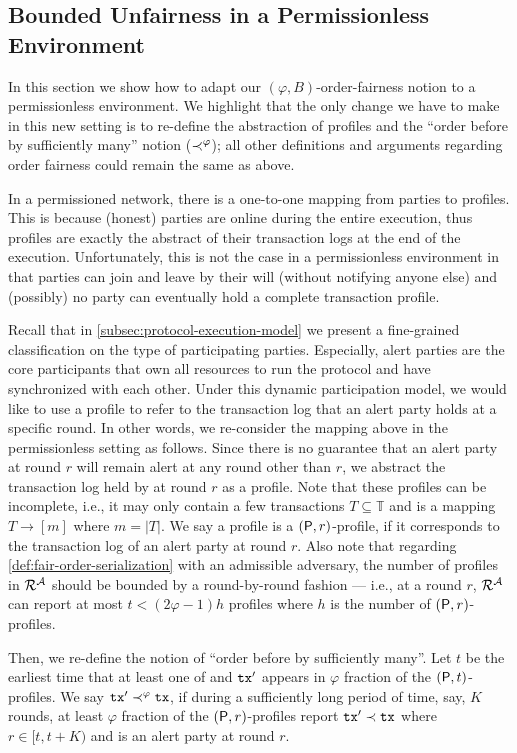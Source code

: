 \subsection{Bounded Unfairness in a  Permissionless Environment}
\label{subsec:order-fiarness-permissionless}

In this section we show how to adapt our $(\varphi, B)$-order-fairness notion to a permissionless environment.
%
We highlight that the only change we have to make in this new setting is to re-define the abstraction of profiles and the ``order before by sufficiently many'' notion ($\prec^\varphi$); all other definitions and arguments regarding order fairness could remain the same as above.

In a permissioned network, there is a one-to-one mapping from parties to profiles.
%
This is because (honest) parties are online during the entire execution, thus profiles are exactly the abstract of their transaction logs at the end of the execution.
%
Unfortunately, this is not the case in a permissionless environment in that parties can join and leave by their will (without notifying anyone else) and (possibly) no party can eventually hold a complete transaction profile.

Recall that in \cref{subsec:protocol-execution-model} we present a fine-grained classification on the type of participating parties.
%
Especially, alert parties are the core participants that own all resources to run the protocol and have synchronized with each other.
%
Under this dynamic participation model, we would like to use a profile to refer to the transaction log that an alert party holds at a specific round.
%
In other words, we re-consider the mapping above in the permissionless setting as follows.
%
Since there is no guarantee that an alert party \party at round $r$ will remain alert at any round other than $r$, we abstract the transaction log held by \party at round $r$ as a profile.
%
Note that these profiles can be incomplete, i.e., it may only contain a few transactions $T \subseteq \mathbb{T}$ and is a mapping $T \rightarrow [m]$ where $m = |T|$.
%
We say a profile is a $(\mathsf{P}, r)$-profile, if it corresponds to the transaction log of an alert party at round $r$.
%
Also note that regarding \cref{def:fair-order-serialization} with an admissible adversary, the number of profiles in $\mathcal{R}^\mathcal{A}$ should be bounded by a round-by-round fashion --- i.e., at a round $r$, $\mathcal{R}^\mathcal{A}$ can report at most $t < (2\varphi - 1) h$ profiles where $h$ is the number of $(\mathsf{P}, r)$-profiles.

Then, we re-define the notion of ``order before by sufficiently many''.
%
Let $t$ be the earliest time that at least one of \tx and $\mathtt{tx}'$ appears in $\varphi$ fraction of the $(\mathsf{P}, t)$-profiles.
%
We say $\mathtt{tx}' \prec^\varphi \mathtt{tx}$, if during a sufficiently long period of time, say, $K$ rounds, at least $\varphi$ fraction of the $(\mathsf{P}, r)$-profiles report $\mathtt{tx}' \prec \mathtt{tx}$ where $r \in [t, t + K)$ and \party is an alert party at round $r$.
